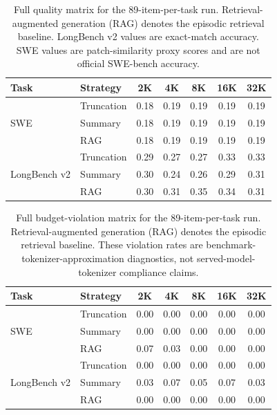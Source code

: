 \begin{table}[p]
\centering
\caption{Full quality matrix for the 89-item-per-task run. Retrieval-augmented generation (RAG) denotes the episodic retrieval baseline. LongBench v2 values are exact-match accuracy. SWE values are patch-similarity proxy scores and are not official SWE-bench accuracy.}
\label{tab:app_quality}
\begin{tabular}{llccccc}
\toprule
Task & Strategy & 2K & 4K & 8K & 16K & 32K \\
\midrule
\multirow{3}{*}{SWE} & Truncation & 0.18 & 0.19 & 0.19 & 0.19 & 0.19 \\
& Summary & 0.18 & 0.19 & 0.19 & 0.19 & 0.19 \\
& RAG & 0.18 & 0.19 & 0.19 & 0.19 & 0.19 \\
\midrule
\multirow{3}{*}{LongBench v2} & Truncation & 0.29 & 0.27 & 0.27 & 0.33 & 0.33 \\
& Summary & 0.30 & 0.24 & 0.26 & 0.29 & 0.31 \\
& RAG & 0.30 & 0.31 & 0.35 & 0.34 & 0.31 \\
\bottomrule
\end{tabular}
\end{table}

\begin{table}[p]
\centering
\caption{Full budget-violation matrix for the 89-item-per-task run. Retrieval-augmented generation (RAG) denotes the episodic retrieval baseline. These violation rates are benchmark-tokenizer-approximation diagnostics, not served-model-tokenizer compliance claims.}
\label{tab:app_violation}
\begin{tabular}{llccccc}
\toprule
Task & Strategy & 2K & 4K & 8K & 16K & 32K \\
\midrule
\multirow{3}{*}{SWE} & Truncation & 0.00 & 0.00 & 0.00 & 0.00 & 0.00 \\
& Summary & 0.00 & 0.00 & 0.00 & 0.00 & 0.00 \\
& RAG & 0.07 & 0.03 & 0.00 & 0.00 & 0.00 \\
\midrule
\multirow{3}{*}{LongBench v2} & Truncation & 0.00 & 0.00 & 0.00 & 0.00 & 0.00 \\
& Summary & 0.03 & 0.07 & 0.05 & 0.07 & 0.03 \\
& RAG & 0.00 & 0.00 & 0.00 & 0.00 & 0.00 \\
\bottomrule
\end{tabular}
\end{table}

